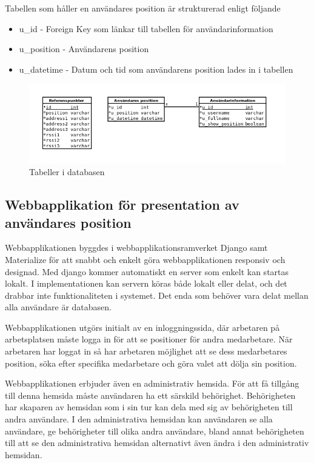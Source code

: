\documentclass[swedish, a4paper,12pt]{article}
\begin{document}
Tabellen som håller en användares position är strukturerad enligt följande
\begin{itemize}
  \item u\_id - Foreign Key som länkar till tabellen för användarinformation
  \item u\_position - Användarens position
  \item u\_datetime - Datum och tid som användarens position lades in i tabellen
\end{itemize}

\begin{figure}[H]
  \includegraphics[width=15cm]{media/db_tabeller.png}
  \caption{Tabeller i databasen}
  \label{fig:db_tabeller}
\end{figure}

\subsection{Webbapplikation för presentation av användares position} \label{webbinterface}
Webbapplikationen byggdes i webbapplikationsramverket Django samt Materialize
för att snabbt och enkelt göra webbapplikationen responsiv och designad. %
 Med django kommer automatiskt en server som enkelt kan startas lokalt. I implementationen kan servern köras både lokalt eller delat, och det drabbar inte funktionaliteten i systemet. Det enda som behöver vara delat mellan alla användare är databasen.

Webbapplikationen utgörs initialt av en inloggningssida, där arbetaren på arbetsplatsen måste logga in för att se positioner för andra medarbetare. När arbetaren har loggat in så har arbetaren möjlighet att se dess medarbetares position, söka efter specifika medarbetare och göra valet att dölja sin position.

Webbapplikationen erbjuder även en administrativ hemsida. För att få tillgång till denna hemsida måste användaren ha ett särskild behörighet. Behörigheten har skaparen av hemsidan som i sin tur kan dela med sig av behörigheten till andra användare. I den administrativa hemsidan kan användaren se alla användare, ge behörigheter till olika andra användare, bland annat behörigheten till att se den administrativa hemsidan alternativt även ändra i den administrativ hemsidan.
\end{document}
